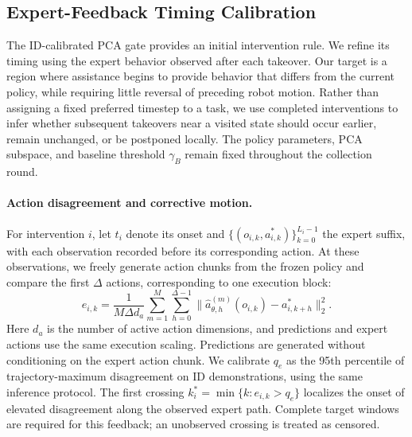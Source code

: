 \subsection{Expert-Feedback Timing Calibration}
\label{sec:ef_timing_calibration}

The ID-calibrated PCA gate provides an initial intervention rule. We refine
its timing using the expert behavior observed after each takeover. Our target
is a region where assistance begins to provide behavior that differs from
the current policy, while requiring little reversal of preceding robot
motion. Rather than assigning a fixed preferred timestep to a task, we use
completed interventions to infer whether subsequent takeovers near a visited
state should occur earlier, remain unchanged, or be postponed locally.
The policy parameters, PCA subspace, and baseline threshold $\gamma_B$
remain fixed throughout the collection round.

\paragraph{Action disagreement and corrective motion.}
For intervention $i$, let $t_i$ denote its onset and
$\{(o_{i,k},a^*_{i,k})\}_{k=0}^{L_i-1}$ the expert suffix, with each
observation recorded before its corresponding action. At these observations,
we freely generate action chunks from the frozen policy and compare the
first $\Delta$ actions, corresponding to one execution block:
\begin{equation}
e_{i,k}=\frac{1}{M\Delta d_a}
\sum_{m=1}^{M}\sum_{h=0}^{\Delta-1}
\|\widehat a^{(m)}_{\theta,h}(o_{i,k})-a^*_{i,k+h}\|_2^2.
\label{eq:ef_disagreement}
\end{equation}
Here $d_a$ is the number of active action dimensions, and predictions and
expert actions use the same execution scaling. Predictions are generated
without conditioning on the expert action chunk. We calibrate $q_e$ as the
95th percentile of trajectory-maximum disagreement on ID demonstrations,
using the same inference protocol. The first crossing
$k_i^*=\min\{k:e_{i,k}>q_e\}$ localizes the onset of elevated disagreement
along the observed expert path. Complete target windows are required for
this feedback; an unobserved crossing is treated as censored.

